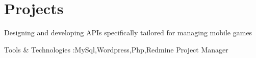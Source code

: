 \documentclass[]{plushcv}
\begin{document}
\begin{minipage}[t]{0.70\textwidth}

\section{Projects}

\begin{tightemize}
\item Designing and developing APIs specifically tailored for managing mobile games
\item  Tools \& Technologies :MySql,Wordpress,Php,Redmine Project Manager
\end{tightemize}
\sectionsep



%
%

\end{minipage} 
\hfill
\end{document}
